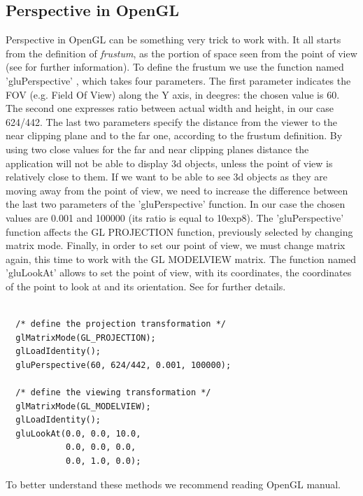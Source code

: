 \subsection{Perspective in OpenGL}
Perspective in OpenGL can be something very trick to work with. 
It all starts from the definition of \textit{frustum}, as the portion
of space seen from the point of view (see \cite{wiki:frustum} 
for further information). To define the frustum we use the function
named 'gluPerspective' \cite{opengl:gluPerspective}, which takes 
four parameters.
%
The first parameter indicates the FOV (e.g. Field Of View) 
along the Y axis, in deegres: the chosen value is 60. The
second one expresses ratio between actual width and height, 
in our case 624/442. The last two parameters specify the distance 
from the viewer to the near clipping plane and to the far one, 
according to the frustum definition.
%
By using two close values for the far and near clipping planes 
distance the application will not be able to display 3d
objects, unless the point of view is relatively close to them. 
If we want to be able to see 3d objects as they are moving away
from the point of view, we need to increase the difference between 
the last two parameters of the 'gluPerspective' function. In
our case the chosen values are 0.001 and 100000 (its ratio is 
equal to 10exp8).
%
The 'gluPerspective' function affects the GL PROJECTION function, 
previously selected by changing matrix mode. Finally,
in order to set our point of view, we must change matrix again, 
this time to work with the GL MODELVIEW matrix. The function named
'gluLookAt' allows to set the point of view, with its coordinates, 
the coordinates of the point to look at and its orientation.
%
See \cite{opengl:gluLookAt} for further details.
%
\begin{lstlisting}[caption={OpenGL perspective example}, label={code:perspective}, frame=trBL]

  /* define the projection transformation */
  glMatrixMode(GL_PROJECTION);
  glLoadIdentity();
  gluPerspective(60, 624/442, 0.001, 100000);
  
  /* define the viewing transformation */
  glMatrixMode(GL_MODELVIEW);
  glLoadIdentity();
  gluLookAt(0.0, 0.0, 10.0,
            0.0, 0.0, 0.0,
            0.0, 1.0, 0.0);

\end{lstlisting}
%
To better understand these methods we recommend reading OpenGL manual.
%
